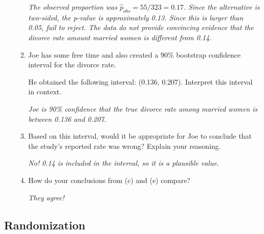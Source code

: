 \documentclass[12pt]{article}   	%
\newcommand{\soln}[2]{\textit{\textcolor{custom_red}{#2}}}{}
\begin{document}
\begin{enumerate}
\begin{enumerate}
    \soln{}{The observed proportion was $\hat{p}_{obs}  = 55/323 = 0.17$. Since the alternative is two-sided, the p-value is approximately 0.13.  Since this is larger than 0.05, fail to reject. The data do not provide convincing evidence that the divorce rate amount married women is different from 0.14.}
  \item
    Joe has some free time and also created a 90\% bootstrap confidence
    interval for the divorce rate.

    He obtained the following interval: (0.136, 0.207). Interpret this
    interval in context.
    
    \soln{}{Joe is 90\% confidence that the true divorce rate among married women is between 0.136 and 0.207.}
  \item
    Based on this interval, would it be appropriate for Joe to conclude
    that the study's reported rate was wrong? Explain your reasoning.
    
    \soln{}{No!  0.14 is included in the interval, so it is a plausible value.}
    
  \item
    How do your conclusions from (c) and (e) compare? 
    
    \soln{}{They agree!}
  \end{enumerate}
\end{enumerate}
  
 
 \subsection*{Randomization}
 
\end{document}

